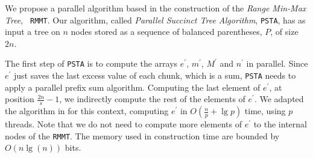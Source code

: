 We propose a parallel algorithm based in the construction of the
\emph{Range Min-Max Tree}, {\tt
  RMMT}. Our algorithm, called
\emph{Parallel Succinct Tree Algorithm}, {\tt PSTA}, has as input a
tree on $n$ nodes stored as a sequence of balanced parentheses, $P$, of
size $2n$.




The first step of {\tt PSTA} is to compute the arrays $e^{\prime}$,
$m^{\prime}$, $M^{\prime}$ and $n^{\prime}$ in parallel. Since
$e^{\prime}$ just saves the last excess value of each chunk, which is
a sum, {\tt PSTA} needs to apply a parallel prefix sum
algorithm. Computing the last element of $e^{\prime}$, at position
$\frac{2n}{s}-1$, we indirectly compute the rest of the elements of
$e^{\prime}$. We adapted the algorithm in \cite{Helman2001265} for
this context, computing $e^{\prime}$ in $O(\frac{n}{p}+\lg p)$ time, using
$p$ threads. Note that we do not need to compute more elements of
$e^{\prime}$ to the internal nodes of the {\tt RMMT}. The memory used
in construction time are bounded by $O(n\lg(n))$ bits.

